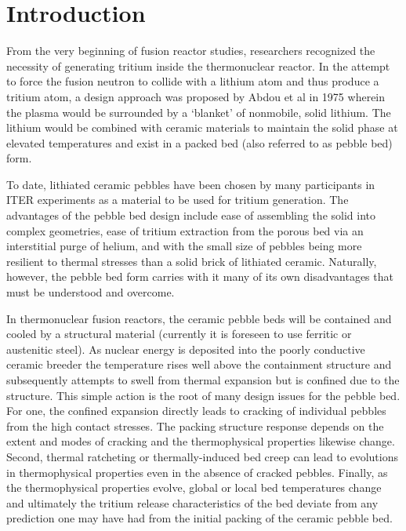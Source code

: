 \chapter{Introduction} \label{sec:introduction}
From the very beginning of fusion reactor studies, researchers recognized the necessity of generating tritium inside the thermonuclear reactor. In the attempt to force the fusion neutron to collide with a lithium atom and thus produce a tritium atom, a design approach was proposed by Abdou et al\cite{Abdou1974d} in 1975 wherein the plasma would be surrounded by a `blanket' of nonmobile, solid lithium. The lithium would be combined with ceramic materials to maintain the solid phase at elevated temperatures and exist in a packed bed (also referred to as pebble bed) form.

To date, lithiated ceramic pebbles have been chosen by many participants in ITER experiments as a material to be used for tritium generation\cite{Lulewicz2002, Mandal2012a, Tsuchiya1998, Cho2012}. The advantages of the pebble bed design include ease of assembling the solid into complex geometries, ease of tritium extraction from the porous bed via an interstitial purge of helium, and with the small size of pebbles being more resilient to thermal stresses than a solid brick of lithiated ceramic. Naturally, however, the pebble bed form carries with it many of its own disadvantages that must be understood and overcome.

In thermonuclear fusion reactors, the ceramic pebble beds will be contained and cooled by a structural material (currently it is foreseen to use ferritic or austenitic steel). As nuclear energy is deposited into the poorly conductive ceramic breeder the temperature rises well above the containment structure and subsequently attempts to swell from thermal expansion but is confined due to the structure. This simple action is the root of many design issues for the pebble bed. For one, the confined expansion directly leads to cracking of individual pebbles from the high contact stresses. The packing structure response depends on the extent and modes of cracking and the thermophysical properties likewise change. Second, thermal ratcheting or thermally-induced bed creep can lead to evolutions in thermophysical properties even in the absence of cracked pebbles. Finally, as the thermophysical properties evolve, global or local bed temperatures change and ultimately the tritium release characteristics of the bed deviate from any prediction one may have had from the initial packing of the ceramic pebble bed. 

